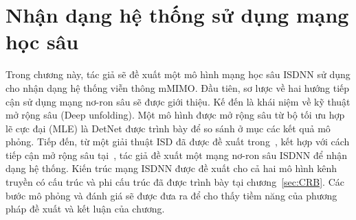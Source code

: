 \clearpage
{}

\setcounter{chapter}{2}
\chapter[NHẬN DẠNG HỆ THỐNG SỬ DỤNG MẠNG HỌC SÂU]{Nhận dạng hệ thống sử dụng mạng học sâu}
\label{sec:ML}

Trong chương này, tác giả sẽ đề xuất một mô hình mạng học sâu ISDNN sử dụng cho nhận dạng hệ thống viễn thông mMIMO. Đầu tiên, sơ lược về hai hướng tiếp cận sử dụng mạng nơ-ron sâu sẽ được giới thiệu. Kế đến là khái niệm về kỹ thuật mở rộng sâu (Deep unfolding). Một mô hình được mở rộng sâu từ bộ tối ưu hợp lẽ cực đại (MLE) là DetNet được trình bày để so sánh ở mục các kết quả mô phỏng. Tiếp đến, từ một giải thuật ISD đã được đề xuất trong~\cite{Mandloi2017}, kết hợp với cách tiếp cận mở rộng sâu tại~\cite{Liao2020}, tác giả đề xuất một mạng nơ-ron sâu ISDNN để nhận dạng hệ thống. Kiến trúc mạng ISDNN được đề xuất cho cả hai mô hình kênh truyền có cấu trúc và phi cấu trúc đã được trình bày tại chương~\ref{sec:CRB}. Các bước mô phỏng và đánh giá sẽ được đưa ra để cho thấy tiềm năng của phương pháp đề xuất và kết luận của chương. 

